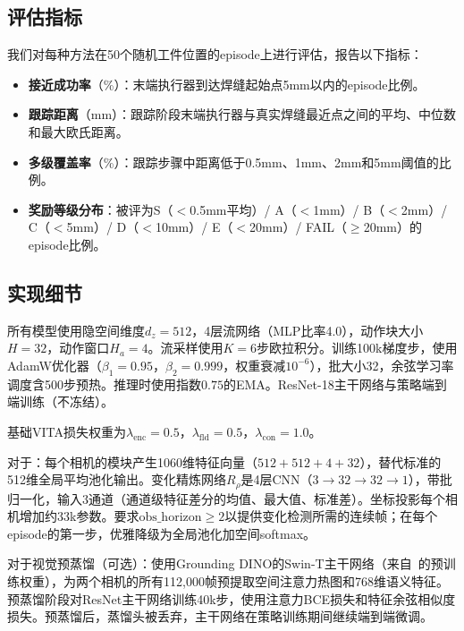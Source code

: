 \subsection{评估指标}
\label{sec:metrics}

我们对每种方法在50个随机工件位置的episode上进行评估，报告以下指标：

\begin{itemize}[leftmargin=*,itemsep=1pt]
    \item \textbf{接近成功率}（\%）：末端执行器到达焊缝起始点5mm以内的episode比例。
    \item \textbf{跟踪距离}（mm）：跟踪阶段末端执行器与真实焊缝最近点之间的平均、中位数和最大欧氏距离。
    \item \textbf{多级覆盖率}（\%）：跟踪步骤中距离低于0.5mm、1mm、2mm和5mm阈值的比例。
    \item \textbf{奖励等级分布}：被评为S（$<$0.5mm平均）/ A（$<$1mm）/ B（$<$2mm）/ C（$<$5mm）/ D（$<$10mm）/ E（$<$20mm）/ FAIL（$\geq$20mm）的episode比例。
\end{itemize}

\subsection{实现细节}
\label{sec:impl_details}

所有模型使用隐空间维度$d_z = 512$，4层流网络（MLP比率4.0），动作块大小$H = 32$，动作窗口$H_a = 4$。流采样使用$K = 6$步欧拉积分。训练100k梯度步，使用AdamW优化器（$\beta_1 = 0.95$，$\beta_2 = 0.999$，权重衰减$10^{-6}$），批大小32，余弦学习率调度含500步预热。推理时使用指数$0.75$的EMA。ResNet-18主干网络与策略端到端训练（不冻结）。

基础VITA损失权重为$\lambda_{\text{enc}} = 0.5$，$\lambda_{\text{fld}} = 0.5$，$\lambda_{\text{con}} = 1.0$。

对于\fasa{}：每个相机的\fasa{}模块产生1060维特征向量（$512 + 512 + 4 + 32$），替代标准的512维全局平均池化输出。变化精炼网络$R_\rho$是4层CNN（$3 \to 32 \to 32 \to 1$），带批归一化，输入3通道（通道级特征差分的均值、最大值、标准差）。坐标投影每个相机增加约33k参数。\fasa{}要求$\text{obs\_horizon} \geq 2$以提供变化检测所需的连续帧；在每个episode的第一步，优雅降级为全局池化加空间softmax。

对于视觉预蒸馏（可选）：使用Grounding DINO的Swin-T主干网络（来自~\cite{liu2023grounding}的预训练权重），为两个相机的所有112,000帧预提取空间注意力热图和768维语义特征。预蒸馏阶段对ResNet主干网络训练40k步，使用注意力BCE损失和特征余弦相似度损失。预蒸馏后，蒸馏头被丢弃，主干网络在策略训练期间继续端到端微调。

